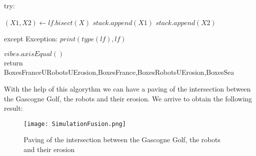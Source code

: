 \documentclass[a4paper,12pt]{report}
\begin{document}
\begin{algorithm}
\begin{algorithmic}
     	\Else
     	
     		try:
     
          			\State $(X1, X2)\gets lf.bisect(X)$
          			\State $stack.append(X1)$
         			\State $stack.append(X2)$
         		\EndIf
         		
         except Exception:
        		 \State $print(type(lf),lf)  $
         	
  		\EndIf
 	 \EndWhile 
	
	\vspace{0.3 cm}
	
  \State $vibes.axisEqual()$\\
  return BoxesFranceURobotsUErosion,BoxesFrance,BoxesRobotsUErosion,BoxesSea


  \end{algorithmic}
\end{algorithm}

\vfill

\clearpage



\newpage

	With the help of this algorythm we can have a paving of the intersection between the Gascogne Golf, the robots and their erosion. We arrive to obtain the following result:
	

	
	\begin{figure}[!h] 
    \center
    	\texttt{[image: SimulationFusion.png]} 
    	\caption{Paving of the intersection between the Gascogne Golf, the robots and their erosion } 
    \label{S1 U S2}
	\end{figure} 
	
	
	
	
	
\end{document}

